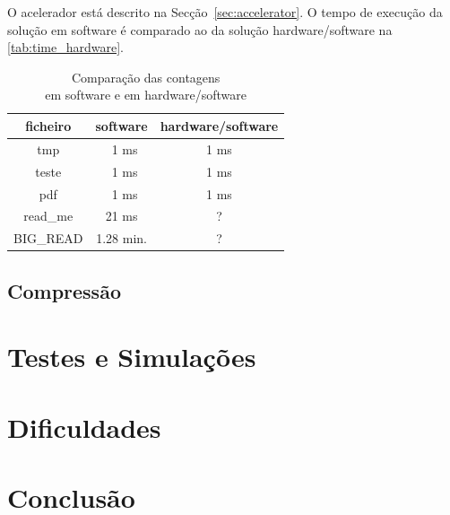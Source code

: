 \documentclass[a4paper]{article}
\begin{document}
	O acelerador está descrito na Secção~\ref{sec:accelerator}. O tempo de execução da solução em software é comparado ao da solução hardware/software na \autoref{tab:time_hardware}.


	\begin{table}
		\centering
		\caption{Comparação das contagens \\em software e em hardware/software}

		\begin{tabular}{|c|c|c|}
			\hline
			ficheiro   & software   & hardware/software \\ \hline \hline
			tmp        & \ 1 ms     & 1 ms         \\ \hline
			teste      & \ 1 ms     & 1 ms         \\ \hline
			pdf        & \ 1 ms     & 1 ms         \\ \hline
			read\_me   & 21 ms      & ?          \\ \hline
			BIG\_READ  & 1.28 min.  & ?         \\
			\hline
		\end{tabular}
		\label{tab:time_hardware}
	\end{table}


	\subsection{Compressão}

	\section{Testes e Simulações}

	\section{Dificuldades}

	\section{Conclusão}

  \pagebreak

  \listoffigures
  \listoftables

\end{document}
